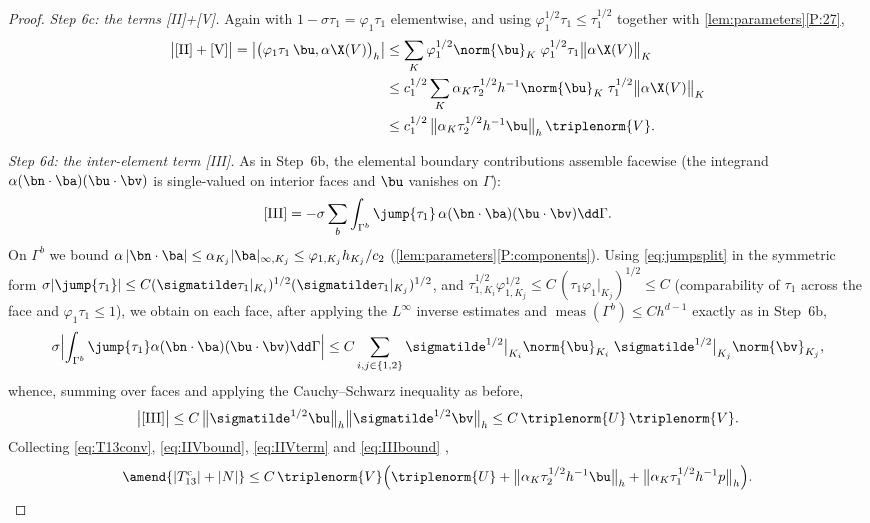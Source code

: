 \begin{proof}
\smallskip\noindent\emph{Step 6c: the terms \textup{[II]+[V]}.}
Again with $1-\sigma\tau_1=\varphi_1\tau_1$ elementwise, and using
$\varphi_1^{1/2}\tau_1\le\tau_1^{1/2}$ together with
\cref{lem:parameters}\ref{P:27},
\begin{align}
  \bigl|\textup{[II]}+\textup{[V]}\bigr|
  = \bigl|\bigl(\varphi_1\tau_1\,\bu,\alpha\X(V)\bigr)_h\bigr|
  &\le \sum_K \varphi_1^{1/2}\norm{\bu}_K\;
  \varphi_1^{1/2}\tau_1\bigl\lVert\alpha\X(V)\bigr\rVert_K
  \nonumber\\
  &\le c_1^{1/2}\sum_K \alpha_K\tau_2^{1/2}h^{-1}\norm{\bu}_K\;
  \tau_1^{1/2}\bigl\lVert\alpha\X(V)\bigr\rVert_K
  \nonumber\\
  &\le c_1^{1/2}\,
  \bigl\lVert\alpha_K\tau_2^{1/2}h^{-1}\bu\bigr\rVert_h\,\triplenorm{V}.
  \label{eq:IIVterm}
\end{align}

\smallskip\noindent\emph{Step 6d: the inter-element term \textup{[III]}.}
As in Step~6b, the elemental boundary contributions assemble facewise (the integrand
$\alpha(\bn\cdot\ba)(\bu\cdot\bv)$ is single-valued on interior faces and $\bu$ vanishes
on $\Gamma$):
\begin{equation*}
  \textup{[III]}
  = -\sigma\sum_b\int_{\Gamma^b}\jump{\tau_1}\,
  \alpha(\bn\cdot\ba)(\bu\cdot\bv)\dd\Gamma .
\end{equation*}
On $\Gamma^b$ we bound $\alpha\,|\bn\cdot\ba|\le\alpha_{K_j}|\ba|_{\infty,K_j}
\le\varphi_{1,K_j}h_{K_j}/c_2$ (\cref{lem:parameters}\ref{P:components}). Using
\eqref{eq:jumpsplit} in the symmetric form
$\sigma|\jump{\tau_1}|\le C(\sigmatilde\tau_1|_{K_i})^{1/2}
(\sigmatilde\tau_1|_{K_j})^{1/2}$, and
$\tau_{1,K_i}^{1/2}\varphi_{1,K_j}^{1/2}\le C\,(\tau_1\varphi_1|_{K_j})^{1/2}\le C$ (comparability of $\tau_1$ across the face
and $\varphi_1\tau_1\le1$), we obtain on each face, after applying the $L^\infty$ inverse
estimates and $\operatorname{meas}(\Gamma^b)\le Ch^{d-1}$ exactly as in Step~6b,
\begin{equation}\label{eq:IIIface}
  \sigma\Bigl|\int_{\Gamma^b}\jump{\tau_1}\alpha(\bn\cdot\ba)(\bu\cdot\bv)
  \dd\Gamma\Bigr|
  \le C\sum_{i,j\in\{1,2\}}
  \sigmatilde^{1/2}\big|_{K_i}\norm{\bu}_{K_i}\;
  \sigmatilde^{1/2}\big|_{K_j}\norm{\bv}_{K_j},
\end{equation}
whence, summing over faces and applying the Cauchy--Schwarz inequality as before,
\begin{equation}\label{eq:IIIbound}
  \bigl|\textup{[III]}\bigr|
  \le C\,\bigl\lVert\sigmatilde^{1/2}\bu\bigr\rVert_h
  \bigl\lVert\sigmatilde^{1/2}\bv\bigr\rVert_h
  \le C\,\triplenorm{U}\,\triplenorm{V}.
\end{equation}
Collecting \eqref{eq:T13conv}, \eqref{eq:IIVbound}, \eqref{eq:IIVterm} and
\eqref{eq:IIIbound} ,
\begin{equation}\label{eq:groupstep}
  \amend{|T_{13}^{\mathrm{c}}| + |N|}
  \le C\,\triplenorm{V}\Bigl(\triplenorm{U}
  + \bigl\lVert\alpha_K\tau_2^{1/2}h^{-1}\bu\bigr\rVert_h
  + \bigl\lVert\alpha_K\tau_1^{1/2}h^{-1}p\bigr\rVert_h\Bigr).
\end{equation}


\end{proof}
